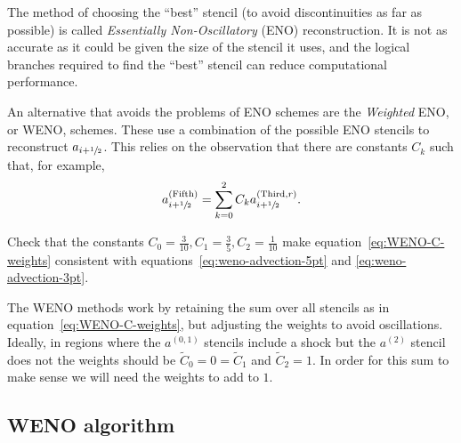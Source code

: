 The method of choosing the ``best'' stencil (to avoid discontinuities as far as
possible) is called \emph{Essentially Non-Oscillatory} (ENO) reconstruction. It
is not as accurate as it could be given the size of the stencil it uses, and
the logical branches required to find the ``best'' stencil can reduce
computational performance.

An alternative that avoids the problems of ENO schemes are the \emph{Weighted}
ENO, or WENO, schemes. These use a combination of the possible ENO stencils to
reconstruct $a_{i+{\sfrac{1}{2}}}$. This relies on the observation that there are
constants $C_k$ such that, for example,
\begin{equation}
  \label{eq:WENO-C-weights}
  a^{(\text{Fifth})}_{i+{\sfrac{1}{2}}} = \sum_{k=0}^{2} C_k a^{(\text{Third}, r)}_{i+{\sfrac{1}{2}}}.
\end{equation}

\begin{exercise}
{Check that the constants $C_0 = \tfrac{3}{10}, C_1 = \tfrac{3}{5}, C_2 =
\tfrac{1}{10}$ make equation~\eqref{eq:WENO-C-weights} consistent with
equations~\eqref{eq:weno-advection-5pt} and \eqref{eq:weno-advection-3pt}.}
\end{exercise}

The WENO methods work by retaining the sum over all stencils as in
equation~\eqref{eq:WENO-C-weights}, but adjusting the weights to avoid
oscillations. Ideally, in regions where the $a^{(0,1)}$ stencils include a
shock but the $a^{(2)}$ stencil does not the weights should be $\tilde{C}_0 = 0
= \tilde{C}_1$ and $\tilde{C}_2 = 1$. In order for this sum to make sense we
will need the weights to add to $1$.

\subsection{WENO algorithm}
\label{sec:WENO-algorithm}

